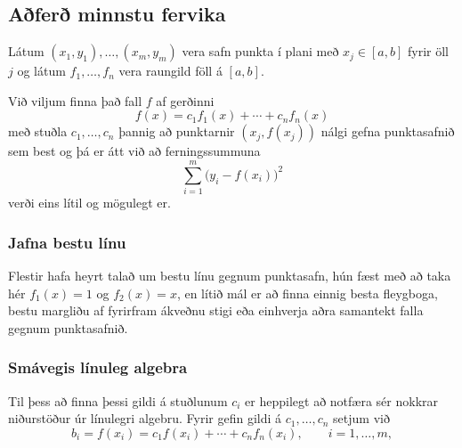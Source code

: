 \documentclass[icelandic,a4paper,12pt]{article}
\begin{document}
% 


\subsection{Aðferð minnstu fervika} 
Látum $(x_1,y_1),\dots,(x_m,y_m)$ vera safn punkta í plani með $x_j\in
[a,b]$ fyrir öll $j$ og látum $f_1,\dots,f_n$ vera raungild föll á
$[a,b]$.  

\pause
\smallskip
Við viljum finna það fall $f$ af gerðinni  
\begin{equation*}
	f(x)=c_1f_1(x) + \cdots + c_nf_n(x)
\end{equation*}
með stuðla $c_1, \ldots, c_n$ þannig að  punktarnir
$(x_j,f(x_j))$ nálgi gefna punktasafnið sem best og þá er átt við að 
ferningssummuna 
\begin{equation*}
	\sum_{i=1}^m\big(y_i-f(x_i)\big)^2
\end{equation*}
verði eins lítil og mögulegt er.


\subsubsection{Jafna bestu línu}
Flestir hafa heyrt talað um bestu línu gegnum punktasafn, hún fæst með
að taka hér $f_1(x) = 1$ og $f_2(x) = x$, en lítið mál er að finna
einnig besta fleygboga, bestu margliðu af fyrirfram ákveðnu stigi eða
einhverja aðra samantekt falla gegnum punktasafnið.  


\subsubsection{Smávegis línuleg algebra} 
Til þess að finna þessi gildi á stuðlunum $c_i$ er heppilegt að
notfæra sér nokkrar niðurstöður úr línulegri algebru. Fyrir gefin
gildi á $c_1,\dots,c_n$ setjum við  
\begin{equation*}
	b_i = f(x_i) = c_1f(x_i) + \cdots + c_n f_n(x_i), 
	\qquad i=1,\dots,m,
\end{equation*}
\end{document}
